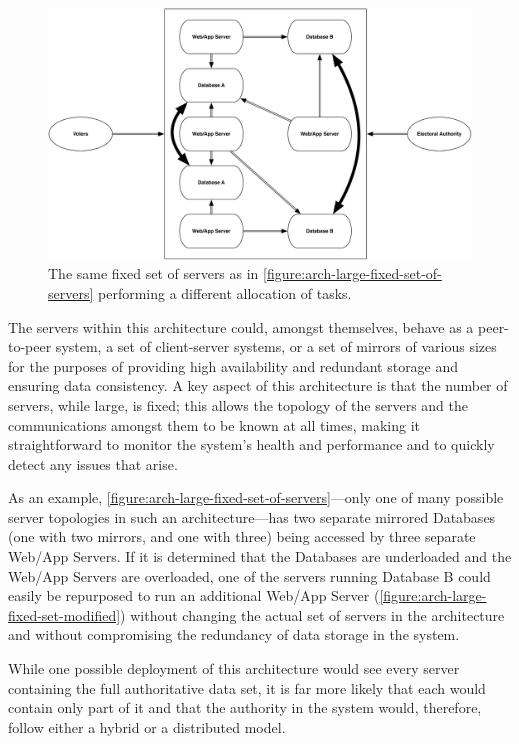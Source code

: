 \begin{figure}
\begin{center}
\includegraphics[width=5.5in]{architecture_resources/large-fixed-set-modified.pdf}
\end{center}
\caption{The same fixed set of servers as in
  \autoref{figure:arch-large-fixed-set-of-servers} performing a different
  allocation of tasks.}
\label{figure:arch-large-fixed-set-modified}
\end{figure}

The servers within this architecture could, amongst themselves, behave
as a peer-to-peer system, a set of client-server systems, or a set of
mirrors of various sizes for the purposes of providing high
availability and redundant storage and ensuring data consistency. A
key aspect of this architecture is that the number of servers, while
large, is fixed; this allows the topology of the servers and the
communications amongst them to be known at all times, making it
straightforward to monitor the system's health and performance and to
quickly detect any issues that arise.

As an example, \autoref{figure:arch-large-fixed-set-of-servers}---only
one of many possible server topologies in such an architecture---has
two separate mirrored Databases (one with two mirrors, and one with
three) being accessed by three separate Web/App Servers. If it is
determined that the Databases are underloaded and the Web/App Servers
are overloaded, one of the servers running Database B could easily be
repurposed to run an additional Web/App Server
(\autoref{figure:arch-large-fixed-set-modified}) without changing the
actual set of servers in the architecture and without compromising the
redundancy of data storage in the system.

While one possible deployment of this architecture would see every
server containing the full authoritative data set, it is far more
likely that each would contain only part of it and that the authority
in the system would, therefore, follow either a hybrid or a distributed
model. 


